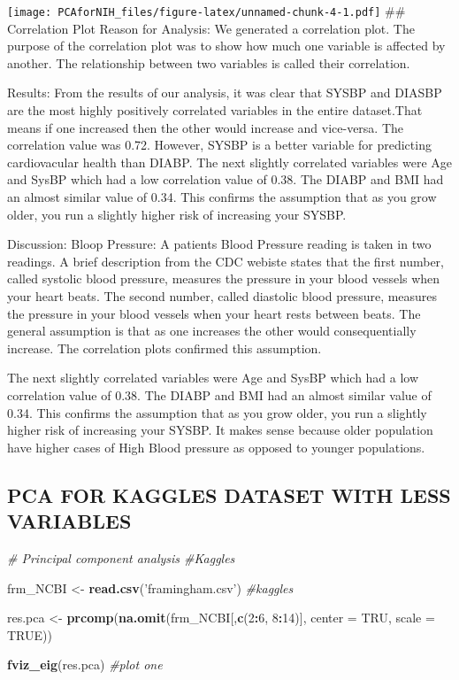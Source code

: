 \documentclass[]{article}
\newenvironment{Shaded}{\begin{snugshade}}{\end{snugshade}}
\newcommand{\KeywordTok}[1]{\textcolor[rgb]{0.13,0.29,0.53}{\textbf{#1}}}
\newcommand{\DataTypeTok}[1]{\textcolor[rgb]{0.13,0.29,0.53}{#1}}
\newcommand{\DecValTok}[1]{\textcolor[rgb]{0.00,0.00,0.81}{#1}}
\newcommand{\StringTok}[1]{\textcolor[rgb]{0.31,0.60,0.02}{#1}}
\newcommand{\CommentTok}[1]{\textcolor[rgb]{0.56,0.35,0.01}{\textit{#1}}}
\newcommand{\OtherTok}[1]{\textcolor[rgb]{0.56,0.35,0.01}{#1}}
\newcommand{\OperatorTok}[1]{\textcolor[rgb]{0.81,0.36,0.00}{\textbf{#1}}}
\newcommand{\NormalTok}[1]{#1}
\begin{document}
\texttt{[image: PCAforNIH\_files/figure-latex/unnamed-chunk-4-1.pdf]}
\#\# Correlation Plot Reason for Analysis: We generated a correlation
plot. The purpose of the correlation plot was to show how much one
variable is affected by another. The relationship between two variables
is called their correlation.

Results: From the results of our analysis, it was clear that SYSBP and
DIASBP are the most highly positively correlated variables in the entire
dataset.That means if one increased then the other would increase and
vice-versa. The correlation value was 0.72. However, SYSBP is a better
variable for predicting cardiovacular health than DIABP. The next
slightly correlated variables were Age and SysBP which had a low
correlation value of 0.38. The DIABP and BMI had an almost similar value
of 0.34. This confirms the assumption that as you grow older, you run a
slightly higher risk of increasing your SYSBP.

Discussion: Bloop Pressure: A patients Blood Pressure reading is taken
in two readings. A brief description from the CDC webiste states that
the first number, called systolic blood pressure, measures the pressure
in your blood vessels when your heart beats. The second number, called
diastolic blood pressure, measures the pressure in your blood vessels
when your heart rests between beats. The general assumption is that as
one increases the other would consequentially increase. The correlation
plots confirmed this assumption.

The next slightly correlated variables were Age and SysBP which had a
low correlation value of 0.38. The DIABP and BMI had an almost similar
value of 0.34. This confirms the assumption that as you grow older, you
run a slightly higher risk of increasing your SYSBP. It makes sense
because older population have higher cases of High Blood pressure as
opposed to younger populations.

\subsection{PCA FOR KAGGLES DATASET WITH LESS
VARIABLES}\label{pca-for-kaggles-dataset-with-less-variables}

\begin{Shaded}
\begin{Highlighting}[]
\CommentTok{# Principal component analysis #Kaggles}

\NormalTok{frm_NCBI <-}\StringTok{ }\KeywordTok{read.csv}\NormalTok{(}\StringTok{'framingham.csv'}\NormalTok{) }\CommentTok{#kaggles}

\NormalTok{res.pca <-}\StringTok{ }\KeywordTok{prcomp}\NormalTok{(}\KeywordTok{na.omit}\NormalTok{(frm_NCBI[,}\KeywordTok{c}\NormalTok{(}\DecValTok{2}\OperatorTok{:}\DecValTok{6}\NormalTok{, }\DecValTok{8}\OperatorTok{:}\DecValTok{14}\NormalTok{)], }\DataTypeTok{center =}\NormalTok{ TRU, }\DataTypeTok{scale =} \OtherTok{TRUE}\NormalTok{))}


\KeywordTok{fviz_eig}\NormalTok{(res.pca) }\CommentTok{#plot one}
\end{Highlighting}
\end{Shaded}
\end{document}
